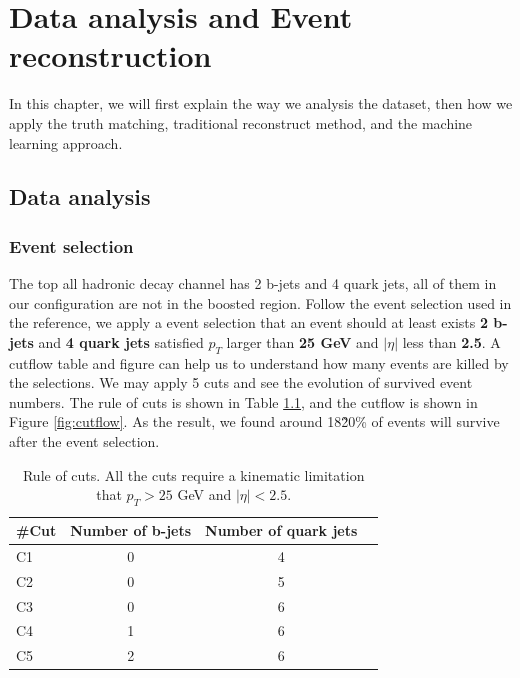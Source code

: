 \chapter{Data analysis and Event reconstruction}\label{section:Reconstruction}

In this chapter, we will first explain the way we analysis the dataset, then how we apply the truth matching, traditional reconstruct method, and the machine learning approach.

\section{Data analysis}\label{sec:Data analysis}

\subsection{Event selection}\label{subsec:Event selection}
The top all hadronic decay channel has 2 b-jets and 4 quark jets, all of them in our configuration are not in the boosted region. Follow the event selection used in the reference\cite{Mccarthy:2015ucy},  we apply a event selection that an event should at least exists \textbf{2 b-jets} and \textbf{4 quark jets} satisfied $p_{T}$ larger than \textbf{25 GeV} and $|\eta|$ less than \textbf{2.5}. A cutflow table and figure can help us to understand how many events are killed by the selections. We may apply 5 cuts and see the evolution of survived event numbers. The rule of cuts is shown in Table \ref{table:cuts}, and the cutflow is shown in Figure \ref{fig:cutflow}. As the result, we found around 18\~20\% of events will survive after the event selection. 

\begin{center}
	\begin{table}[h]
		\begin{tabular}{p{} c c c }
			\cline{1-3}
			\#Cut    & Number of b-jets & Number of quark jets  \\
			\hline
			C1      &   0  & 4    \\
			C2      &   0  & 5    \\
			C3      &   0  & 6    \\
			C4      &   1  & 6    \\
			C5      &   2  & 6    \\
			\hline
		\end{tabular}
		\caption{Rule of cuts. All the cuts require a kinematic limitation that $p_{T} > 25$ GeV and $|\eta|<2.5$.}
		\label{table:cuts}
	\end{table}
\end{center}

